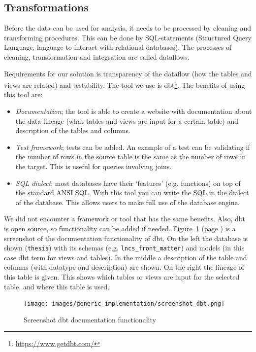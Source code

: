 \documentclass{ou-report}
\begin{document}
\subsection{Transformations}
\label{gen_impl:dbt}
Before the data can be used for analysis, it needs to be processed by cleaning
and transforming procedures. This can be done by SQL-statements (Structured
Query Language, language to interact with relational databases). The processes
of cleaning, transformation and integration are called dataflows.

Requirements for our solution is transparency of the dataflow (how the
tables and views are related) and testability.
The tool we use is dbt\footnote{\url{https://www.getdbt.com/}}. The benefits of
using this tool are:
\begin{itemize}
    \item \emph{Documentation}; the tool is able to create a website with
    documentation about the data lineage (what tables and views are input for a
    certain table) and description of the tables and columns.
    \item \emph{Test framework}; tests can be added. An example of a test can be
    validating if the number of rows in the source table is the same as the
    number of rows in the target. This is useful for queries involving joins.
    \item \emph{SQL dialect}; most databases have their `features' (e.g.
    functions) on top of the standard ANSI SQL. With this tool you can write the
    SQL in the dialect of the database. This allows users to make full use of
    the database engine.
\end{itemize}
We did not encounter a framework or tool that has the same benefits. Also, dbt
is open source, so functionality can be added if needed.
Figure~\ref{fig:dbt} (page \pageref{fig:dbt}) is a screenshot of the documentation functionality of dbt.
On the left the database is shown (\verb|thesis|) with its schemas (e.g.
\verb|lncs_front_matter|) and models (in this case dbt term for views and
tables). In the middle a description of the table and columns (with datatype and
description) are shown. On the right the lineage of this table is given. This 
shows which tables or views are input for the selected table, and where this
table is used.

\begin{figure}[h]
\centering
\texttt{[image: images/generic\_implementation/screenshot\_dbt.png]}
\caption{Screenshot dbt documentation functionality}
\label{fig:dbt}
\end{figure}
\end{document}
